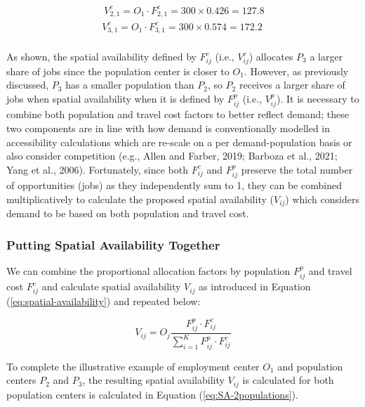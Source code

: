 \documentclass[]{elsarticle} %
\begin{document}
\begin{equation}
\label{eq:tcost-allocation-factor-SA-2populations}
\begin{array}{l}\
V^c_{2,1} = O_1 \cdot F^c_{2,1} = 300 \times 0.426 = 127.8\\
V^c_{3,1} = O_1 \cdot F^c_{3,1} = 300 \times  0.574 = 172.2\\
\end{array}
\end{equation}

As shown, the spatial availability defined by \(F^c_{ij}\) (i.e.,
\(V^c_{ij}\)) allocates \(P_3\) a larger share of jobs since the
population center is closer to \(O_1\). However, as previously
discussed, \(P_3\) has a smaller population than \(P_2\), so \(P_2\)
receives a larger share of jobs when spatial availability when it is
defined by \(F^p_{ij}\) (i.e., \(V^p_{ij}\)). It is necessary to combine
both population and travel cost factors to better reflect demand; these
two components are in line with how demand is conventionally modelled in
accessibility calculations which are re-scale on a per demand-population
basis or also consider competition (e.g., Allen and Farber, 2019;
Barboza et al., 2021; Yang et al., 2006). Fortunately, since both
\(F^c_{ij}\) and \(F^p_{ij}\) preserve the total number of opportunities
(jobs) as they independently sum to 1, they can be combined
multiplicatively to calculate the proposed spatial availability
(\(V_{ij}\)) which considers demand to be based on both population and
travel cost.

\hypertarget{putting-spatial-availability-together}{%
\subsubsection{Putting Spatial Availability
Together}\label{putting-spatial-availability-together}}

We can combine the proportional allocation factors by population
\(F^p_{ij}\) and travel cost \(F^c_{ij}\) and calculate spatial
availability \(V_{ij}\) as introduced in Equation
(\ref{eq:spatial-availability}) and repeated below:

\[
V_{ij} = O_j\frac{F^p_{ij} \cdot F^c_{ij}}{\sum_{i=1}^K F^p_{ij} \cdot F^c_{ij}}
\]

To complete the illustrative example of employment center \(O_1\) and
population centers \(P_2\) and \(P_3\), the resulting spatial
availability \(V_{ij}\) is calculated for both population centers is
calculated in Equation (\ref{eq:SA-2populations}).
\end{document}
